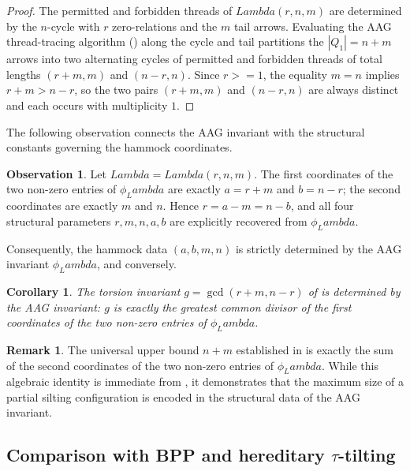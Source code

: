 \documentclass[11pt, a4paper]{article}
\newtheorem{corollary}[theorem]{Corollary}
\theoremstyle{definition}
\newtheorem{remark}[theorem]{Remark}
\newtheorem{observation}[theorem]{Observation}
\def\Lambda{Lambda}%
\def\ge{>=}%
\begin{document}
\begin{proof}
The permitted and forbidden threads of $\Lambda(r,n,m)$ are determined by the $n$-cycle with $r$ zero-relations and the $m$ tail arrows. Evaluating the AAG thread-tracing algorithm (\cite[Section~3]{AAG2008}) along the cycle and tail partitions the $|Q_1| = n+m$ arrows into two alternating cycles of permitted and forbidden threads of total lengths $(r+m, m)$ and $(n-r, n)$. Since $r \ge 1$, the equality $m = n$ implies $r+m > n-r$, so the two pairs $(r+m, m)$ and $(n-r, n)$ are always distinct and each occurs with multiplicity $1$.
\end{proof}

The following observation connects the AAG invariant with the structural constants governing the hammock coordinates.

\begin{observation}\label{obs:AAG}
Let $\Lambda=\Lambda(r,n,m)$. The first coordinates of the two non-zero entries of $\phi_\Lambda$ are exactly $a = r+m$ and $b = n-r$; the second coordinates are exactly $m$ and $n$. Hence $r = a-m = n-b$, and all four structural parameters $r,m,n,a,b$ are explicitly recovered from $\phi_\Lambda$.

Consequently, the hammock data $(a,b,m,n)$ is strictly determined by the AAG invariant $\phi_\Lambda$, and conversely.
\end{observation}

\begin{corollary}\label{cor:AAG-g}
The torsion invariant $g=\gcd(r+m,n-r)$ of  is determined by the AAG invariant: $g$ is exactly the greatest common divisor of the first coordinates of the two non-zero entries of $\phi_\Lambda$.
\end{corollary}

\begin{remark}\label{rem:AAG-bound}
The universal upper bound $n+m$ established in  is exactly the sum of the second coordinates of the two non-zero entries of $\phi_\Lambda$. While this algebraic identity is immediate from , it demonstrates that the maximum size of a partial silting configuration is encoded in the structural data of the AAG invariant.
\end{remark}

\subsection{Comparison with BPP and hereditary \texorpdfstring{$\tau$}{tau}-tilting}\label{subsec:AAG-BPP}
\end{document}

